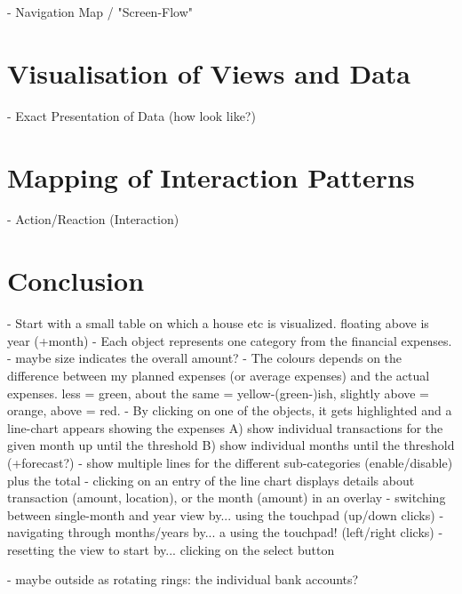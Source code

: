 - Navigation Map / "Screen-Flow"




\section{Visualisation of Views and Data}

- Exact Presentation of Data (how look like?)



\section{Mapping of Interaction Patterns}

- Action/Reaction (Interaction)





\section{Conclusion}




- Start with a small table on which a house etc is visualized. floating above is year (+month)
- Each object represents one category from the financial expenses.
- maybe size indicates the overall amount?
- The colours depends on the difference between my planned expenses (or average expenses) and the actual expenses. less = green, about the same = yellow-(green-)ish, slightly above = orange, above = red.
- By clicking on one of the objects, it gets highlighted and a line-chart appears showing the expenses
   A) show individual transactions for the given month up until the threshold
   B) show individual months until the threshold (+forecast?)
- show multiple lines for the different sub-categories (enable/disable) plus the total
- clicking on an entry of the line chart displays details about transaction (amount, location), or the month (amount) in an overlay
- switching between single-month and year view by... using the touchpad (up/down clicks)
- navigating through months/years by... a using the touchpad! (left/right clicks)
- resetting the view to start by... clicking on the select button

- maybe outside as rotating rings: the individual bank accounts?


